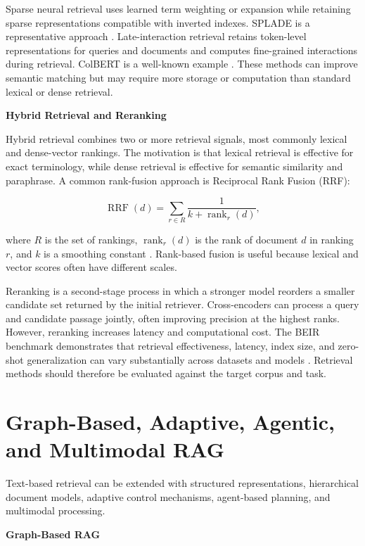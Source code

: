 \documentclass[12pt,a4paper]{report}
\numberwithin{equation}{chapter}
\begin{document}
Sparse neural retrieval uses learned term weighting or expansion while retaining sparse representations compatible with inverted indexes. SPLADE is a representative approach \cite{Formal2021}. Late-interaction retrieval retains token-level representations for queries and documents and computes fine-grained interactions during retrieval. ColBERT is a well-known example \cite{Khattab2020}. These methods can improve semantic matching but may require more storage or computation than standard lexical or dense retrieval.
\par\medskip
\textbf{Hybrid Retrieval and Reranking}

Hybrid retrieval combines two or more retrieval signals, most commonly lexical and dense-vector rankings. The motivation is that lexical retrieval is effective for exact terminology, while dense retrieval is effective for semantic similarity and paraphrase. A common rank-fusion approach is Reciprocal Rank Fusion (RRF):

\begin{equation}
\label{eq:rrf}
\operatorname{RRF}(d)=
\sum_{r \in R}\frac{1}{k+\operatorname{rank}_{r}(d)},
\end{equation}

where \(R\) is the set of rankings, \(\operatorname{rank}_{r}(d)\) is the rank of document \(d\) in ranking \(r\), and \(k\) is a smoothing constant \cite{Cormack2009}. Rank-based fusion is useful because lexical and vector scores often have different scales.

Reranking is a second-stage process in which a stronger model reorders a smaller candidate set returned by the initial retriever. Cross-encoders can process a query and candidate passage jointly, often improving precision at the highest ranks. However, reranking increases latency and computational cost. The BEIR benchmark demonstrates that retrieval effectiveness, latency, index size, and zero-shot generalization can vary substantially across datasets and models \cite{Thakur2021}. Retrieval methods should therefore be evaluated against the target corpus and task.


\section{Graph-Based, Adaptive, Agentic, and Multimodal RAG}

Text-based retrieval can be extended with structured representations, hierarchical document models, adaptive control mechanisms, agent-based planning, and multimodal processing.
\par\medskip
\textbf{Graph-Based RAG}
\end{document}
